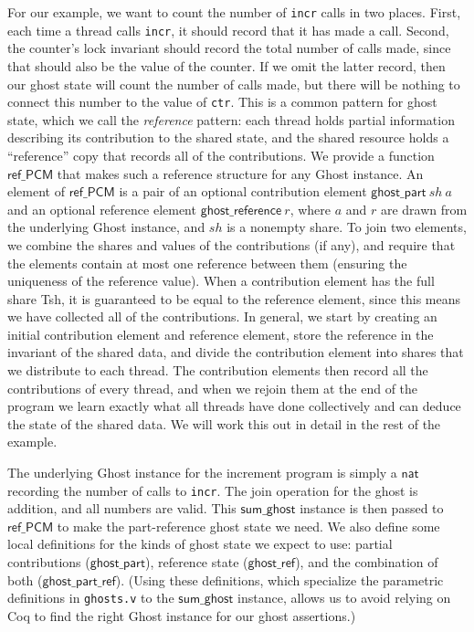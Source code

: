 \documentclass[11pt]{article} %
\begin{document}
For our example, we want to count the number of \texttt{incr} calls in two places. First, each time a thread calls \texttt{incr}, it should record that it has made a call. Second, the counter's lock invariant should record the total number of calls made, since that should also be the value of the counter. If we omit the latter record, then our ghost state will count the number of calls made, but there will be nothing to connect this number to the value of \texttt{ctr}. This is a common pattern for ghost state, which we call the \emph{reference} pattern: each thread holds partial information describing its contribution to the shared state, and the shared resource holds a ``reference'' copy that records all of the contributions. We provide a function $\mathsf{ref\_PCM}$ that makes such a reference structure for any \textsf{Ghost} instance. An element of $\mathsf{ref\_PCM}$ is a pair of an optional contribution element $\mathsf{ghost\_part}\ \mathit{sh}\ a$ and an optional reference element $\mathsf{ghost\_reference}\ r$, where $a$ and $r$ are drawn from the underlying \textsf{Ghost} instance, and $\mathit{sh}$ is a nonempty share. To join two elements, we combine the shares and values of the contributions (if any), and require that the elements contain at most one reference between them (ensuring the uniqueness of the reference value). When a contribution element has the full share \textsf{Tsh}, it is guaranteed to be equal to the reference element, since this means we have collected all of the contributions. In general, we start by creating an initial contribution element and reference element, store the reference in the invariant of the shared data, and divide the contribution element into shares that we distribute to each thread. The contribution elements then record all the contributions of every thread, and when we rejoin them at the end of the program we learn exactly what all threads have done collectively and can deduce the state of the shared data. We will work this out in detail in the rest of the example.

The underlying \textsf{Ghost} instance for the increment program is simply a $\mathsf{nat}$ recording the number of calls to \texttt{incr}. The join operation for the ghost is addition, and all numbers are valid. This $\mathsf{sum\_ghost}$ instance is then passed to $\mathsf{ref\_PCM}$ to make the part-reference ghost state we need. We also define some local definitions for the kinds of ghost state we expect to use: partial contributions ($\mathsf{ghost\_part}$), reference state ($\mathsf{ghost\_ref}$), and the combination of both ($\mathsf{ghost\_part\_ref}$). (Using these definitions, which specialize the parametric definitions in \texttt{ghosts.v} to the $\mathsf{sum\_ghost}$ instance, allows us to avoid relying on Coq to find the right \textsf{Ghost} instance for our ghost assertions.)
\end{document}
